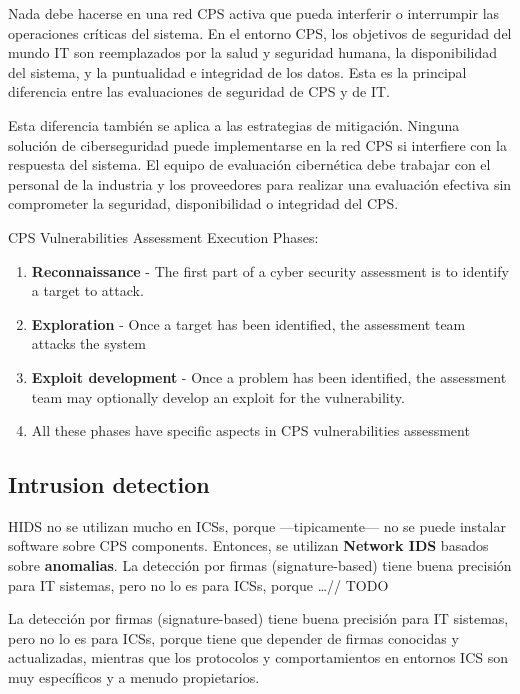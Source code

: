 Nada debe hacerse en una red CPS activa que pueda interferir o interrumpir las operaciones críticas del sistema. En el entorno CPS, los objetivos de seguridad del mundo IT son reemplazados por la salud y seguridad humana, la disponibilidad del sistema, y la puntualidad e integridad de los datos. Esta es la principal diferencia entre las evaluaciones de seguridad de CPS y de IT.

Esta diferencia también se aplica a las estrategias de mitigación. Ninguna solución de ciberseguridad puede implementarse en la red CPS si interfiere con la respuesta del sistema. El equipo de evaluación cibernética debe trabajar con el personal de la industria y los proveedores para realizar una evaluación efectiva sin comprometer la seguridad, disponibilidad o integridad del CPS.

CPS Vulnerabilities Assessment Execution Phases:
\begin{enumerate}
	\item \textbf{Reconnaissance} -
	The first part of a cyber security assessment is to identify a
target to attack.
	\item \textbf{Exploration} -
	Once a target has been identified, the assessment team attacks
the system
	\item \textbf{Exploit development} -
	Once a problem has been identified, the assessment team may
optionally develop an exploit for the vulnerability.
\item[] All these phases have specific aspects in CPS vulnerabilities assessment
\end{enumerate}

\subsection{Intrusion detection}

HIDS no se utilizan mucho en ICSs, porque ---tipicamente--- no se puede instalar software sobre CPS components.
Entonces, se utilizan \textbf{Network IDS} basados sobre \textbf{anomalias}.
La detección por firmas (signature-based) tiene buena precisión para IT sistemas, pero no lo es para ICSs, porque \dots // TODO

La detección por firmas (signature-based) tiene buena precisión para IT sistemas, pero no lo es para ICSs, porque tiene que depender de firmas conocidas y actualizadas, mientras que los protocolos y comportamientos en entornos ICS son muy específicos y a menudo propietarios.


